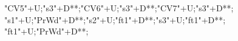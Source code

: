 \begin{multicols}{3}
\begin{exe}
{				"CV5"+U;"s3"+D**\dir{-};"CV6"+U;"s3"+D**\dir{-};"CV7"+U;"s3"+D**\dir{-};
				"s1"+U;"PrWd"+D**\dir{-};"s2"+U;"ft1"+D**\dir{-};"s3"+U;"ft1"+D**\dir{-};
				"ft1"+U;"PrWd"+D**\dir{-};
		\endxy}
	\end{exe}
\end{multicols}

